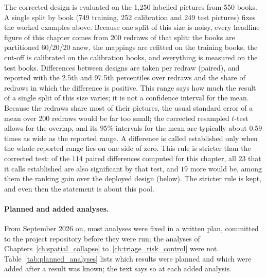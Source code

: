 The corrected design is evaluated on the 1,250 labelled pictures from 550 books. A single split by book (749 training, 252 calibration and 249 test pictures) fixes the worked examples above. Because one split of this size is noisy, every headline figure of this chapter comes from 200 redraws of that split: the books are partitioned 60/20/20 anew, the mappings are refitted on the training books, the cut-off is calibrated on the calibration books, and everything is measured on the test books. Differences between designs are taken per redraw (paired), and reported with the 2.5th and 97.5th percentiles over redraws and the share of redraws in which the difference is positive. This range says how much the result of a single split of this size varies; it is not a confidence interval for the mean. Because the redraws share most of their pictures, the usual standard error of a mean over 200 redraws would be far too small; the corrected resampled $t$-test \cite{nadeau2003inference} allows for the overlap, and its $95\%$ intervals for the mean are typically about $0.59$ times as wide as the reported range. A difference is called established only when the whole reported range lies on one side of zero. This rule is stricter than the corrected test: of the $114$ paired differences computed for this chapter, all $23$ that it calls established are also significant by that test, and $19$ more would be, among them the ranking gain over the deployed design (below). The stricter rule is kept, and even then the statement is about this pool.

\paragraph{Planned and added analyses.} From September 2026 on, most analyses were fixed in a written plan, committed to the project repository before they were run; the analyses of Chapters~\ref{ch:spatial_collapse} to~\ref{ch:triage_risk_control} were not. Table~\ref{tab:planned_analyses} lists which results were planned and which were added after a result was known; the text says so at each added analysis.

